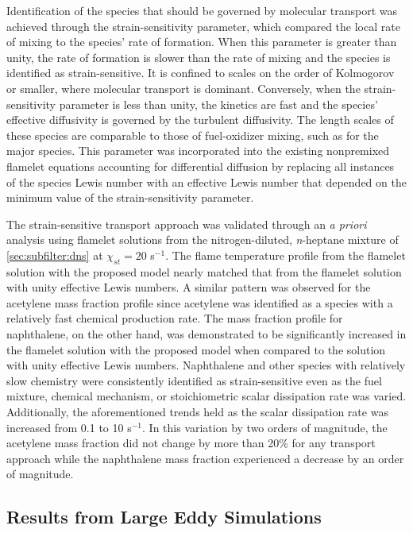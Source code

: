 Identification of the species that should be governed by molecular transport was achieved through the strain-sensitivity parameter, which compared the local rate of mixing to the species' rate of formation. When this parameter is greater than unity, the rate of formation is slower than the rate of mixing and the species is identified as strain-sensitive. It is confined to scales on the order of Kolmogorov or smaller, where molecular transport is dominant. Conversely, when the strain-sensitivity parameter is less than unity, the kinetics are fast and the species' effective diffusivity is governed by the turbulent diffusivity. The length scales of these species are comparable to those of fuel-oxidizer mixing, such as for the major species. This parameter was incorporated into the existing nonpremixed flamelet equations accounting for differential diffusion by replacing all instances of the species Lewis number with an effective Lewis number that depended on the minimum value of the strain-sensitivity parameter.

The strain-sensitive transport approach was validated through an \textit{a priori} analysis using flamelet solutions from the nitrogen-diluted, \textit{n}-heptane mixture of \cref{sec:subfilter:dns} at $\chi_{st} = 20$ s$^{-1}$. The flame temperature profile from the flamelet solution with the proposed model nearly matched that from the flamelet solution with unity effective Lewis numbers. A similar pattern was observed for the acetylene mass fraction profile since acetylene was identified as a species with a relatively fast chemical production rate. The mass fraction profile for naphthalene, on the other hand, was demonstrated to be significantly increased in the flamelet solution with the proposed model when compared to the solution with unity effective Lewis numbers. Naphthalene and other species with relatively slow chemistry were consistently identified as strain-sensitive even as the fuel mixture, chemical mechanism, or stoichiometric scalar dissipation rate was varied. Additionally, the aforementioned trends held as the scalar dissipation rate was increased from 0.1 to 10 s$^{-1}$. In this variation by two orders of magnitude, the acetylene mass fraction did not change by more than 20\% for any transport approach while the naphthalene mass fraction experienced a decrease by an order of magnitude.

\subsection{Results from Large Eddy Simulations}
\label{sec:conclusion:contributions:les}

